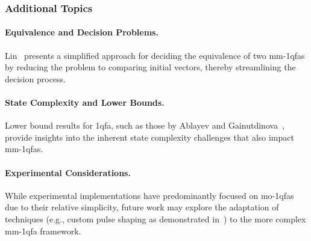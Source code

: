 \subsubsection{Additional Topics}
\paragraph{Equivalence and Decision Problems.} Lin~\cite{lin2012another} presents a simplified approach for deciding the equivalence of two \glspl{mm-1qfa} by reducing the problem to comparing initial vectors, thereby streamlining the decision process.

\paragraph{State Complexity and Lower Bounds.} Lower bound results for \gls{1qfa}, such as those by Ablayev and Gainutdinova~\cite{ablayev2000lower}, provide insights into the inherent state complexity challenges that also impact \glspl{mm-1qfa}.
 
\paragraph{Experimental Considerations.} While experimental implementations have predominantly focused on \gls{mo-1qfa}s due to their relative simplicity, future work may explore the adaptation of techniques (e.g., custom pulse shaping as demonstrated in~\cite{lussi2024implementing}) to the more complex \gls{mm-1qfa} framework.

